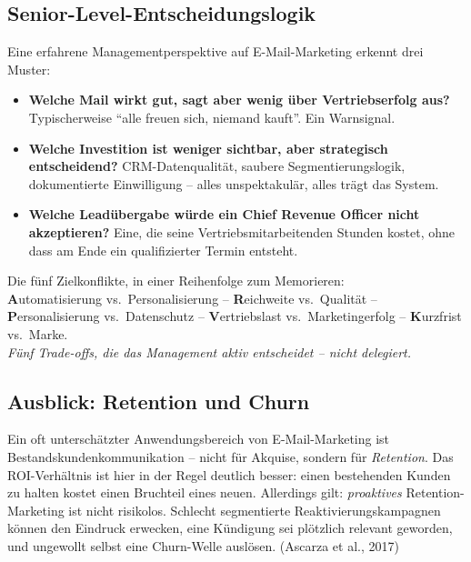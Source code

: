 \documentclass[11pt,a4paper,oneside]{article}
\newcommand{\caveatfontfallback}{\itshape}
\newcommand\caveatfont{\caveatfontfallback}%
\newcommand{\akzent}[1]{{\caveatfont\color{lpAmber}#1}}
\newcommand{\quelle}[1]{{\footnotesize\color{lpGray}(#1)}}
\begin{document}
\subsection{Senior-Level-Entscheidungslogik}

Eine erfahrene Managementperspektive auf E-Mail-Marketing erkennt drei Muster:

\begin{itemize}
  \item \textbf{Welche Mail wirkt gut, sagt aber wenig über Vertriebserfolg aus?} Typischerweise ``alle freuen sich, niemand kauft''. Ein Warnsignal.
  \item \textbf{Welche Investition ist weniger sichtbar, aber strategisch entscheidend?} CRM-Datenqualität, saubere Segmentierungslogik, dokumentierte Einwilligung -- alles unspektakulär, alles trägt das System.
  \item \textbf{Welche Leadübergabe würde ein Chief Revenue Officer nicht akzeptieren?} Eine, die seine Vertriebsmitarbeitenden Stunden kostet, ohne dass am Ende ein qualifizierter Termin entsteht.
\end{itemize}

\begin{eselsbox}[Eselsbrücke: \akzent{A-R-P-V-K}]
Die fünf Zielkonflikte, in einer Reihenfolge zum Memorieren:\\[2pt]
\textbf{A}utomatisierung vs.\ Personalisierung -- \textbf{R}eichweite vs.\ Qualität -- \textbf{P}ersonalisierung vs.\ Datenschutz -- \textbf{V}ertriebslast vs.\ Marketingerfolg -- \textbf{K}urzfrist vs.\ Marke.\\[2pt]
\emph{Fünf Trade-offs, die das Management aktiv entscheidet -- nicht delegiert.}
\end{eselsbox}

\subsection{Ausblick: Retention und Churn}

Ein oft unterschätzter Anwendungsbereich von E-Mail-Marketing ist Bestandskundenkommunikation -- nicht für Akquise, sondern für \emph{Retention}. Das ROI-Verhältnis ist hier in der Regel deutlich besser: einen bestehenden Kunden zu halten kostet einen Bruchteil eines neuen. Allerdings gilt: \emph{proaktives} Retention-Marketing ist nicht risikolos. Schlecht segmentierte Reaktivierungskampagnen können den Eindruck erwecken, eine Kündigung sei plötzlich relevant geworden, und ungewollt selbst eine Churn-Welle auslösen. \quelle{Ascarza et al., 2017}
\end{document}
